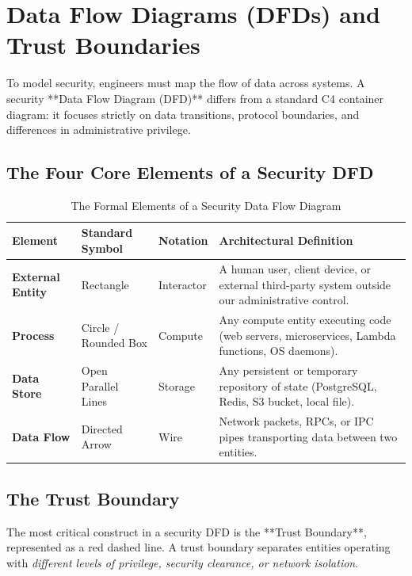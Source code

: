 \section{Data Flow Diagrams (DFDs) and Trust Boundaries}

To model security, engineers must map the flow of data across systems. A security **Data Flow Diagram (DFD)** differs from a standard C4 container diagram: it focuses strictly on data transitions, protocol boundaries, and differences in administrative privilege.

\subsection{The Four Core Elements of a Security DFD}

\begin{table}[htbp]
\centering\small
\begin{tabular}{lllp{6.0cm}}
\toprule
\textbf{Element} & \textbf{Standard Symbol} & \textbf{Notation} & \textbf{Architectural Definition} \\
\midrule
\textbf{External Entity} & Rectangle & Interactor & A human user, client device, or external third-party system outside our administrative control. \\
\textbf{Process} & Circle / Rounded Box & Compute & Any compute entity executing code (web servers, microservices, Lambda functions, OS daemons). \\
\textbf{Data Store} & Open Parallel Lines & Storage & Any persistent or temporary repository of state (PostgreSQL, Redis, S3 bucket, local file). \\
\textbf{Data Flow} & Directed Arrow & Wire & Network packets, RPCs, or IPC pipes transporting data between two entities. \\
\bottomrule
\end{tabular}
\caption{The Formal Elements of a Security Data Flow Diagram}
\label{tab:dfd-elements}
\end{table}

\subsection{The Trust Boundary}

The most critical construct in a security DFD is the **Trust Boundary**, represented as a red dashed line. A trust boundary separates entities operating with \textit{different levels of privilege, security clearance, or network isolation}.

